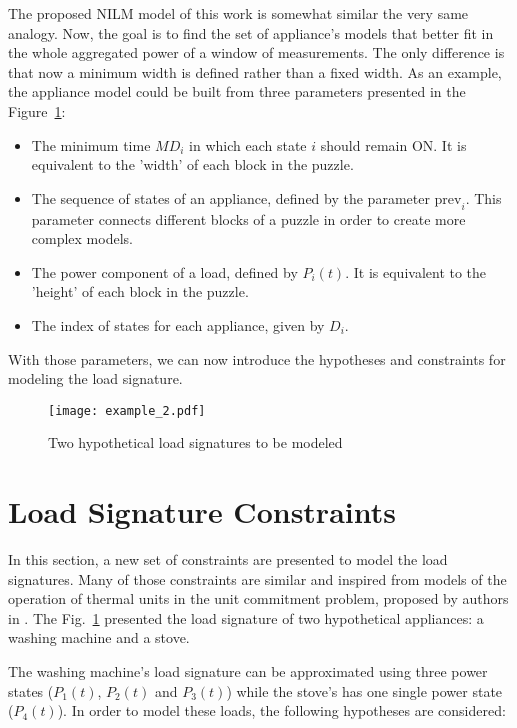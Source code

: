 The proposed NILM model of this work is somewhat similar the very same analogy. Now, the goal is to find the set of appliance's models that better fit in the whole aggregated power of a window of measurements. The only difference is that now a minimum width is defined rather than a fixed width. As an example, the appliance model could be built from three parameters presented in the Figure~\ref{example_sign}: 

\begin{itemize}
\item The minimum time $MD_i$ in which each state $i$ should remain ON. It is equivalent to the 'width' of each block in the puzzle.
\item The sequence of states of an appliance, defined by the parameter $\text{prev}_i$. This parameter connects different blocks of a puzzle in order to create more complex models.
\item The power component of a load, defined by $P_i(t)$. It is equivalent to the 'height' of each block in the puzzle.
\item The index of states for each appliance, given by $D_i$.
\end{itemize}

With those parameters, we can now introduce the hypotheses and constraints for modeling the load signature.  
\begin{figure}[htb]
    \centering
    \texttt{[image: example\_2.pdf]}
    \caption{Two hypothetical load signatures to be modeled}
    \label{example_sign}
\end{figure}



\section{Load Signature Constraints}

In this section, a new set of constraints are presented to model the load signatures. Many of those constraints are similar and inspired from models of the operation of thermal units in the unit commitment problem, proposed by authors in \cite{carrion2006}. The Fig.~\ref{example_sign} presented the load signature of two hypothetical appliances: a washing machine and a stove.


The washing machine's load signature can be approximated using three power states ($P_1(t)$, $P_2(t)$ and $P_3(t)$) while the stove's has one single power state ($P_4(t)$). In order to model these loads, the following hypotheses are considered: 

